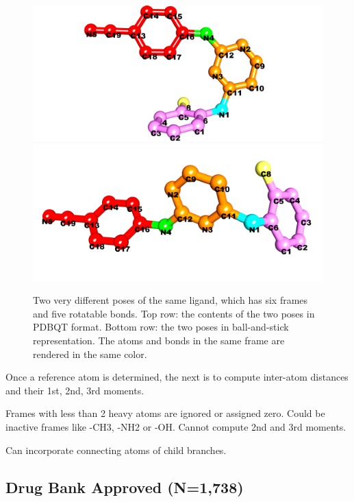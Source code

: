 \documentclass[twocolumn]{svjour3}          %
\begin{document}
\begin{figure}
\endminipage
\\
\centering
\includegraphics[width=1.36\textwidth,natwidth=1904,natheight=894]{../usrt/T27Crystal.png}
\endminipage
{}
\centering
\includegraphics[width=1.36\textwidth,natwidth=1904,natheight=894]{../usrt/T27Docked.png}
\endminipage
\caption{Two very different poses of the same ligand, which has six frames and five rotatable bonds. Top row: the contents of the two poses in PDBQT format. Bottom row: the two poses in ball-and-stick representation. The atoms and bonds in the same frame are rendered in the same color.}
\label{fig:T27}
\end{figure}

Once a reference atom is determined, the next is to compute inter-atom distances and their 1st, 2nd, 3rd moments.

Frames with less than 2 heavy atoms are ignored or assigned zero. Could be inactive frames like -CH3, -NH2 or -OH. Cannot compute 2nd and 3rd moments.

Can incorporate connecting atoms of child branches.

\subsection{Drug Bank Approved (N=1,738)}
\end{document}
